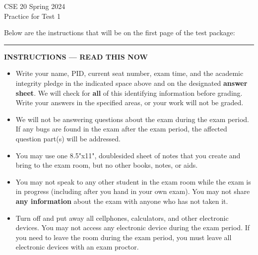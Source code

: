 \documentclass[12pt, oneside]{article}
\begin{document}
\newif \ifsolution
\solutiontrue
\solutionfalse

\newcommand{\sol}[1]{\medskip\fbox{\begin{minipage}{5.5in}{#1}\end{minipage}}\medskip}


\begin{center}
{\Large
CSE 20 Spring 2024\\ 
Practice for Test 1 \ifsolution{\qquad Solutions}\fi}
\end{center}

\thispagestyle{empty}

\ifsolution{}
\else{}
Below are the instructions that will be on the first page of the test package:

\begin{center}
  \begin{minipage}[t]{7in}
  \rule{\linewidth}{2pt}
  \textbf{INSTRUCTIONS --- READ THIS NOW}
  \begin{itemize}
  
  \setlength{\itemsep}{0.025in}
  
  \item  Write your name, PID, current seat number, exam time, 
  and the academic integrity pledge in the indicated space above and 
  on the designated  {\bf answer sheet}.
  We will check for {\bf all} of this identifying information before grading.
  Write your answers in the specified areas, or your work will not be graded. 
  
  \item We will not be answering questions about the exam during the exam period. 
  If any bugs are found in the exam after the exam period, the affected question part(s) will be addressed.
  
  \item  You may use one 8.5"x11", doublesided sheet of notes that you create and bring to the exam room, but no other books, notes, or aids.
  
  \item You may not speak to any other student in the exam room while the exam 
  is in progress (including after you hand in your own exam).  You may not share
  {\bf any information} about the exam with anyone who has not taken it.
  
  \item Turn off and put away all cellphones, calculators, and other electronic devices.
  You may not access any electronic device during the exam period. If you need to leave 
  the room during the exam period, you must leave all electronic devices with an exam proctor.
  

\end{itemize}
\end{minipage}
\end{center}
\end{document}
